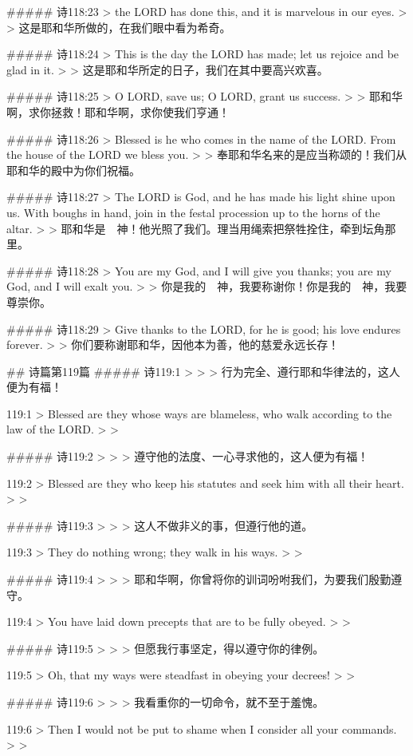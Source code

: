 ##### 诗118:23
> the LORD has done this, and it is marvelous in our eyes.
>
> 这是耶和华所做的，在我们眼中看为希奇。


##### 诗118:24
> This is the day the LORD has made; let us rejoice and be glad in it.
>
> 这是耶和华所定的日子，我们在其中要高兴欢喜。


##### 诗118:25
> O LORD, save us; O LORD, grant us success.
>
> 耶和华啊，求你拯救！耶和华啊，求你使我们亨通！


##### 诗118:26
> Blessed is he who comes in the name of the LORD. From the house of the LORD we bless you.
>
> 奉耶和华名来的是应当称颂的！我们从耶和华的殿中为你们祝福。


##### 诗118:27
> The LORD is God, and he has made his light shine upon us. With boughs in hand, join in the festal procession up to the horns of the altar.
>
> 耶和华是　神！他光照了我们。理当用绳索把祭牲拴住，牵到坛角那里。


##### 诗118:28
> You are my God, and I will give you thanks; you are my God, and I will exalt you.
>
> 你是我的　神，我要称谢你！你是我的　神，我要尊崇你。


##### 诗118:29
> Give thanks to the LORD, for he is good; his love endures forever.
>
> 你们要称谢耶和华，因他本为善，他的慈爱永远长存！


## 诗篇第119篇
##### 诗119:1
> 
>
> 行为完全、遵行耶和华律法的，这人便为有福！


119:1
> Blessed are they whose ways are blameless, who walk according to the law of the LORD.
>
> 


##### 诗119:2
> 
>
> 遵守他的法度、一心寻求他的，这人便为有福！


119:2
> Blessed are they who keep his statutes and seek him with all their heart.
>
> 


##### 诗119:3
> 
>
> 这人不做非义的事，但遵行他的道。


119:3
> They do nothing wrong; they walk in his ways.
>
> 


##### 诗119:4
> 
>
> 耶和华啊，你曾将你的训词吩咐我们，为要我们殷勤遵守。


119:4
> You have laid down precepts that are to be fully obeyed.
>
> 


##### 诗119:5
> 
>
> 但愿我行事坚定，得以遵守你的律例。


119:5
> Oh, that my ways were steadfast in obeying your decrees!
>
> 


##### 诗119:6
> 
>
> 我看重你的一切命令，就不至于羞愧。


119:6
> Then I would not be put to shame when I consider all your commands.
>
> 


